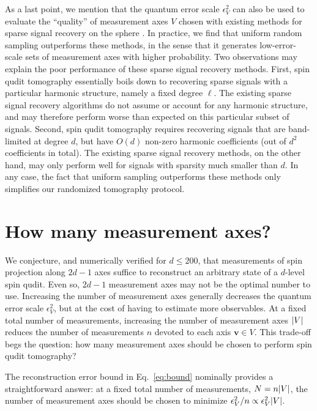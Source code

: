 \documentclass[notitlepage,twocolumn]{revtex4-2}
\renewcommand{\v}{\bm} %
\begin{document}
As a last point, we mention that the quantum error scale $\epsilon_V^2$ can also be used to evaluate the ``quality'' of measurement axes $V$ chosen with existing methods for sparse signal recovery on the sphere \cite{rauhut2011sparse, alem2012sparse}.
In practice, we find that uniform random sampling outperforms these methods, in the sense that it generates low-error-scale sets of measurement axes with higher probability.
Two observations may explain the poor performance of these sparse signal recovery methods.
First, spin qudit tomography essentially boils down to recovering sparse signals with a particular harmonic structure, namely a fixed degree $\ell$.
The existing sparse signal recovery algorithms do not assume or account for any harmonic structure, and may therefore perform worse than expected on this particular subset of signals.
Second, spin qudit tomography requires recovering signals that are band-limited at degree $d$, but have $O(d)$ non-zero harmonic coefficients (out of $d^2$ coefficients in total).
The existing sparse signal recovery methods, on the other hand, may only perform well for signals with sparsity much smaller than $d$.
In any case, the fact that uniform sampling outperforms these methods only simplifies our randomized tomography protocol.

\section{How many measurement axes?}
\label{sec:axes}

We conjecture, and numerically verified for $d\le200$, that measurements of spin projection along $2d-1$ axes suffice to reconstruct an arbitrary state of a $d$-level spin qudit.
Even so, $2d-1$ measurement axes may not be the optimal number to use.
Increasing the number of measurement axes generally decreases the quantum error scale $\epsilon_V^2$, but at the cost of having to estimate more observables.
At a fixed total number of measurements, increasing the number of measurement axes $\abs{V}$ reduces the number of measurements $n$ devoted to each axis $\v v\in V$.
This trade-off begs the question: how many measurement axes should be chosen to perform spin qudit tomography?

The reconstruction error bound in Eq.~\eqref{eq:bound} nominally provides a straightforward answer: at a fixed total number of measurements, $N=n\abs{V}$, the number of measurement axes should be chosen to minimize $\epsilon_V^2/n\propto\epsilon_V^2\abs{V}$.
\end{document}
